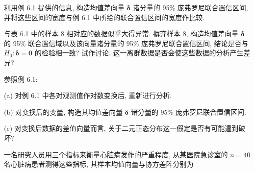 \quad 利用例 6.1 提供的信息, 构造均值差向量 $\boldsymbol{\delta}$ 诸分量的 95\% 庞弗罗尼联合置信区间, 并将这些区间的宽度与例 6.1 中所给的联合置信区间的宽度作比较.

\quad 与\hyperref[tab:6.1]{表 6.1} 中的样本 8 相对应的数据似乎大得异常. 摒弃样本 8, 构造均值差向量 $\boldsymbol{\delta}$ 的 95\% 联合置信域以及该向量诸分量的 95\% 庞弗罗尼联合置信区间, 结论是否与 $H_0: \boldsymbol{\delta}=\mathbf{0}$ 的检验相一致? 试作讨论. 这一离群数据是否会使这些数据的分析产生差异?

\quad 参照例 6.1:

\noindent (a) 对例 6.1 中各对观测值作对数变换后, 重新进行分析.

\noindent (b) 对变换后的变量, 构造其均值差向量 $\boldsymbol{\delta}$ 诸分量的 95\% 庞弗罗尼联合置信区间.

\noindent (c) 对变换后数据的差值向量而言, 关于二元正态分布这一假定是否有可能遭到破坏?

\quad 一名研究人员用三个指标来衡量心脏病发作的严重程度, 从某医院急诊室的 $n=40$ 名心脏病患者测得这些指标, 其样本均值向量与协方差阵分别为
